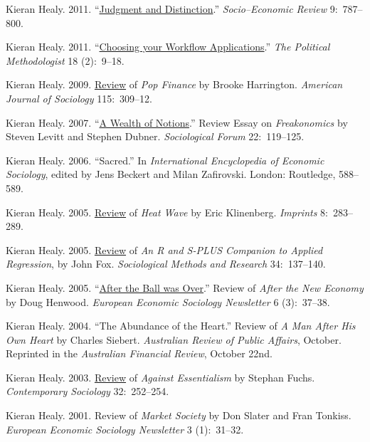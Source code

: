 \documentclass[11pt,article,oneside]{memoir}
\begin{document}
\ind Kieran Healy. 2011. ``\href{http://www.kieranhealy.org/files/reviews/karpik-review.pdf}{Judgment and Distinction}.'' \emph{Socio--Economic Review} 9:~787--800. 

\ind Kieran Healy. 2011. ``\href{http://polmeth.wustl.edu/methodologist/tpm_v18_n2.pdf}{Choosing your Workflow Applications}.'' \emph{The Political Methodologist} 18 (2):~9--18. 

\ind Kieran Healy. 2009. \href{http://www.journals.uchicago.edu/doi/pdf/10.1086/605757}{Review} of \emph{Pop Finance} by Brooke Harrington. \emph{American Journal of Sociology} 115:~309--12.

\ind Kieran Healy. 2007. ``\href{http://www.kieranhealy.org/files/reviews/socforum-article.pdf}{A Wealth of Notions}.'' Review
Essay on \emph{Freakonomics} by Steven Levitt and Stephen Dubner. \emph{Sociological Forum} 22:~119--125. 

\ind  Kieran Healy. 2006. ``Sacred.'' In \emph{International Encyclopedia of Economic Sociology}, edited by Jens Beckert and Milan Zafirovski. London: Routledge, 588--589. 

\ind  Kieran Healy. 2005. \href{http://www.kieranhealy.org/files/reviews/klinenberg.pdf}{Review} of \emph{Heat Wave} by Eric Klinenberg. \emph{Imprints} 8:~283--289.

\ind  Kieran Healy. 2005. \href{http://www.kieranhealy.org/files/reviews/fox.pdf}{Review} of \emph{An R and S-PLUS Companion to Applied Regression}, by John Fox. \emph{Sociological Methods and Research} 34:~137--140.

\ind  Kieran Healy. 2005. ``\href{http://www.kieranhealy.org/files/reviews/henwood.pdf}{After the Ball was Over}.'' Review of \emph{After the New
  Economy} by Doug Henwood. \emph{European Economic Sociology Newsletter} 6 (3):~37--38.

\ind  Kieran Healy. 2004. ``The Abundance of the Heart.'' Review of \emph{A Man After His Own Heart} by Charles
Siebert. \emph{Australian Review of Public Affairs}, October. Reprinted in the
\emph{Australian Financial Review}, October 22nd.

\ind  Kieran Healy. 2003. \href{http://links.jstor.org/sici?sici=0094-3061%28200303%2932%3A2%3C252%3AAEATOC%3E2.0.CO%3B2-F}{Review} of \emph{Against Essentialism} by Stephan Fuchs.
\emph{Contemporary Sociology} 32:~252--254.

\ind  Kieran Healy. 2001. Review of \emph{Market Society} by Don Slater and Fran Tonkiss. \emph{European Economic Sociology Newsletter} 3 (1):~31--32.
\end{document}
